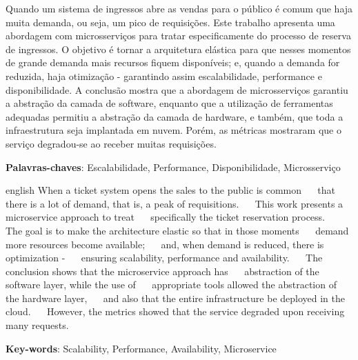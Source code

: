 \setlength{\absparsep}{18pt} %
\begin{resumo}


  Quando um sistema de ingressos abre as vendas para o público é comum
  que haja muita demanda, ou seja, um pico de requisições.
  Este trabalho apresenta uma abordagem com microsserviços para tratar
  especificamente do processo de reserva de ingressos.
  O objetivo é tornar a arquitetura elástica para que nesses momentos
  de grande demanda mais recursos fiquem disponíveis;
  e, quando a demanda for reduzida, haja otimização -
  garantindo assim escalabilidade, performance e disponibilidade.
  A conclusão mostra que a abordagem de microsserviços garantiu a
  abstração da camada de software, enquanto que a utilização de
  ferramentas adequadas permitiu a abstração da camada de hardware,
  e também, que toda a infraestrutura seja implantada em nuvem.
  Porém, as métricas mostraram que o serviço degradou-se ao receber muitas requisições.

  \textbf{Palavras-chaves}: Escalabilidade, Performance, Disponibilidade, Microsserviço


\end{resumo}

\begin{resumo}[Abstract]
 \begin{otherlanguage*}{english}
   When a ticket system opens the sales to the public is common
   that there is a lot of demand, that is, a peak of requisitions.
   This work presents a microservice approach to treat
   specifically the ticket reservation process.
   The goal is to make the architecture elastic so that in those moments
   demand more resources become available;
   and, when demand is reduced, there is optimization -
   ensuring scalability, performance and availability.
   The conclusion shows that the microservice approach has
   abstraction of the software layer, while the use of
   appropriate tools allowed the abstraction of the hardware layer,
   and also that the entire infrastructure be deployed in the cloud.
   However, the metrics showed that the service degraded upon receiving many requests.

   \vspace{\onelineskip}

   \noindent
   \textbf{Key-words}: Scalability, Performance, Availability, Microservice
 \end{otherlanguage*}
\end{resumo}
